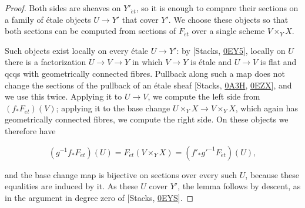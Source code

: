 \documentclass[11pt]{article}
\begin{document}
\begin{proof}[{Proof}]\label{bp648}%
Both sides are sheaves on \(Y'_{\acute{e}t}\), so it is enough to compare their sections on a family of étale objects \(U\to Y'\) that cover \(Y'\). We choose these objects so that both sections can be computed from sections of \(F_{\acute{e}t}\) over a single scheme \(V\times_YX\).

Such objects exist locally on every étale \(U\to Y'\): by [Stacks, \href{https://stacks.math.columbia.edu/tag/0EY5}{0EY5}], locally on \(U\) there is a factorization \(U\to V\to Y\) in which \(V\to Y\) is étale and \(U\to V\) is flat and qcqs with geometrically connected fibres. Pullback along such a map does not change the sections of the pullback of an étale sheaf [Stacks, \href{https://stacks.math.columbia.edu/tag/0A3H}{0A3H}, \href{https://stacks.math.columbia.edu/tag/0EZX}{0EZX}], and we use this twice. Applying it to \(U\to V\), we compute the left side from \((f_*F_{\acute{e}t})(V)\); applying it to the base change \(U\times_YX\to V\times_YX\), which again has geometrically connected fibres, we compute the right side. On these objects we therefore have

\[
(g^{-1}f_*F_{\acute{e}t})(U)
=F_{\acute{e}t}(V\times_Y X)
=(f'_*g'^{-1}F_{\acute{e}t})(U),
\]

and the base change map is bijective on sections over every such \(U\), because these equalities are induced by it. As these \(U\) cover \(Y'\), the lemma follows by descent, as in the argument in degree zero of [Stacks, \href{https://stacks.math.columbia.edu/tag/0EYS}{0EYS}].
\end{proof}


\end{document}
